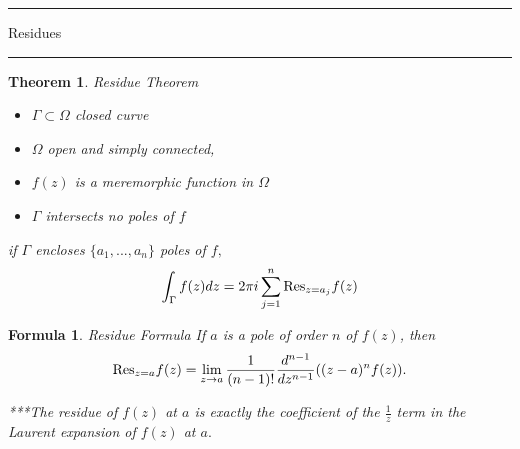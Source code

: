 \documentclass[12pt]{Qual}
\newtheorem{theorem}{Theorem}
\newtheorem{formula}{Formula}
\begin{document}
\begin{center}
\noindent\textcolor{blue!60!black}{\rule{15cm}{1mm}}
\Huge \faBug\faPuzzlePiece\faCoffee Residues \faCoffee\faPuzzlePiece\faBug
\vspace{-0.5cm}
\noindent\textcolor{blue!60!black}{\rule{15cm}{1mm}}
\end{center}
\vspace{0.5cm}
\begin{theorem}{\Large\textit{Residue Theorem}}

\vspace{-0.25cm}
\begin{itemize}[leftmargin=2.5cm]
\setlength\itemsep{-0.1em}
\renewcommand\labelitemi{\faPuzzlePiece}
    \item $\Gamma\subset\Omega$ closed curve
    \item $\Omega$ open and simply connected,
    \item $f(z)$ is a meremorphic function in $\Omega$
    \item $\Gamma$ intersects no poles of $f$
\end{itemize}

 if $\Gamma$ encloses $\{a_1,...,a_n\}$ poles of $f,$ $$\int_\Gamma f(z)dz=2\pi i\sum_{j=1}^n\text{Res}_{z=a_j}f(z)$$

\end{theorem}
\vspace{0.5cm}
\begin{formula}{\Large\textit{Residue Formula}}
If $a$ is a pole of order $n$ of $f(z)$, then
$$\text{Res}_{z=a}f(z)=\lim_{z\to a}\frac{1}{(n-1)!}\frac{d^{n-1}}{dz^{n-1}}((z-a)^nf(z)).$$

***The residue of $f(z)$ at $a$ is exactly the coefficient of the $\frac{1}{z}$ term in the Laurent expansion of $f(z)$ at $a.$
\end{formula}
\vspace{0.5cm}
\end{document}
